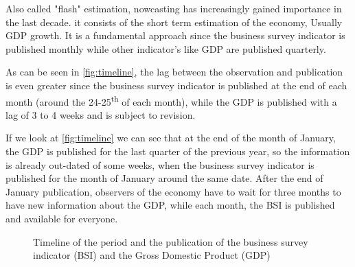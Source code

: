 \documentclass[12pt,a4paper,oneside]{book}
\newcommand{\ImageWidth}{11cm}
\begin{document}
Also called "flash" estimation, nowcasting has increasingly gained importance in the last decade.
it consists of the short term estimation of the economy, Usually GDP growth.
It is a fundamental approach since the business survey indicator is published monthly while other indicator's like GDP are published quarterly.

As can be seen in \autoref{fig:timeline}, 
the lag between the observation and publication is even greater since the business survey indicator is published at the end of each month (around the 24-25\textsuperscript{th} of each month), while the GDP is published with a lag of 3 to 4 weeks and is subject to revision.

If we look at \autoref{fig:timeline} we can see that at the end of the month of January, the GDP is published for the last quarter of the previous year, so the information is already out-dated of some weeks, when the business survey indicator is published for the month of January around the same date. After the end of January publication, observers of the economy have to wait for three months to have new information about the GDP, while each month, the BSI is published and available for everyone.

\begin{figure}[htp!]
     \centering \footnotesize
    \small
    \caption{Timeline of the period and the publication of the business survey indicator (BSI) and the Gross Domestic Product (GDP)}
    \label{fig:timeline}
\end{figure}
\end{document}
